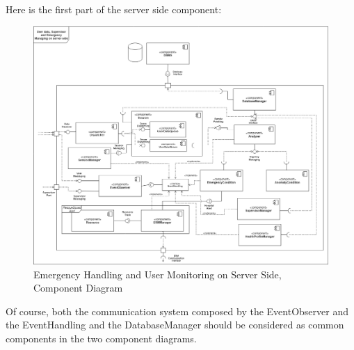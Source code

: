 \begin{flushleft}
{Here is the first part of the server side component:
\begin{figure}[H]
	\centering
	\includegraphics[scale=0.4]{images/uml/ASOS_server_emergency_component}
	\caption{Emergency Handling and User Monitoring on Server Side, Component Diagram}
	\label{Figure 5}
\end{figure}

Of course, both the communication system composed by the EventObserver and the EventHandling and the DatabaseManager should be considered as common components in the two component diagrams.
\newpage

}
\end{flushleft}
